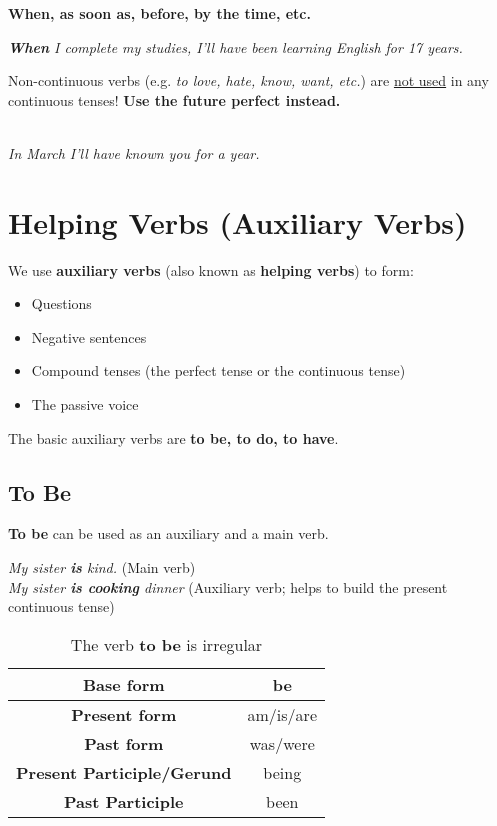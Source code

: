 \documentclass[hidelinks,10pt,a4paper]{article}
\begin{document}
\textbf{When, as soon as, before, by the time, etc.}

\begin{center}
	\textit{ \textbf{When} I complete my studies, I'll have been learning English for 17 years.}
\end{center}

Non-continuous verbs (e.g. \textit{to love, hate, know, want, etc.}) are \underline{not used} in any continuous tenses! \textbf{Use the future perfect instead.}

\begin{center}
	\textit{  \\
	In March I'll have known you for a year.}
\end{center}

\section{Helping Verbs (Auxiliary Verbs)}
We use \textbf{auxiliary verbs} (also known as \textbf{helping verbs}) to form:

\begin{itemize}
	\item Questions
	\item Negative sentences
	\item Compound tenses (the perfect tense or the continuous tense)
	\item The passive voice
\end{itemize}

The basic auxiliary verbs are \textbf{to be, to do, to have}.

\newpage
\subsection{To Be}
\textbf{To be} can be used as an auxiliary and a main verb.

\begin{center}
	\textit{My sister \textbf{is} kind.} (Main verb) \\
	\textit{My sister \textbf{is cooking} dinner} (Auxiliary verb; helps to build the present continuous tense)
\end{center}

\begin{table}[h]
\begin{center}
\begin{tabular}{|c|c|}
	\hline
	\textbf{Base form} & be \\ \hline
	\textbf{Present form}  & am/is/are \\ \hline
	\textbf{Past form} & was/were \\ \hline
	\textbf{Present Participle/Gerund} & being \\ \hline
	\textbf{Past Participle} & been \\ \hline
\end{tabular}
\end{center}
\caption{The verb \textbf{to be} is irregular} \label{tab:tobe1}
\end{table}
\end{document}
